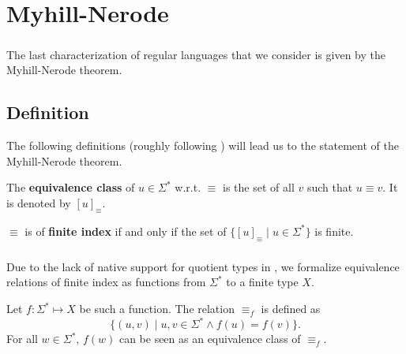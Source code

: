 
\chapter{Myhill-Nerode}
\label{chap:MN}

\paragraph{}

The last characterization of regular languages that we consider is given by the Myhill-Nerode theorem.

\section{Definition}

The following definitions (roughly following \cite{DBLP:books/daglib/0088160}) will lead us to the statement of the Myhill-Nerode theorem.

\begin{definition}
    The \textbf{equivalence class} of $u \in \Sigma^*$ w.r.t. $\equiv$ is the set of all $v$ such that $u \equiv v$.
    It is denoted by $[u]_\equiv$.
\end{definition}

\begin{definition}
    $\equiv$ is of \textbf{finite index} if and only if the set of $\{[u]_\equiv \; | \; u \in \Sigma^* \}$ is finite.
\end{definition}

\paragraph{}
Due to the lack of native support for quotient types in \coq, 
we formalize equivalence relations of finite index 
as functions from $\Sigma^*$ to a finite type $X$.

\begin{definition}
    \label{equiv_f}
    Let $f: \Sigma^* \mapsto X$ be such a function.
    The relation $\equiv_f$ is defined as
    \begin{equation*}
        \{ (u, v) \; | \; u,v \in \Sigma^* \wedge f(u) = f(v) \}.
    \end{equation*}
    For all $w \in \Sigma^*$, $f(w)$ can be seen as an equivalence class of $\equiv_f$.
\end{definition}

